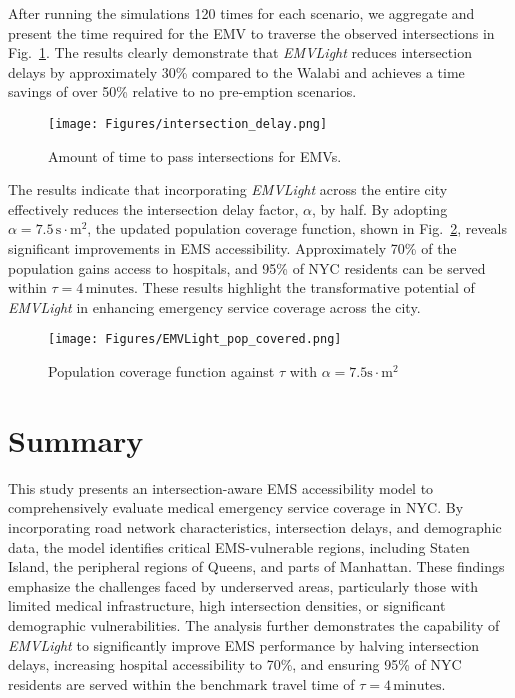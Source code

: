 After running the simulations 120 times for each scenario, we aggregate and present the time required for the EMV to traverse the observed intersections in Fig.~\ref{fig:intersection_delay}. The results clearly demonstrate that \textit{EMVLight} reduces intersection delays by approximately 30\% compared to the Walabi and achieves a time savings of over 50\% relative to no pre-emption scenarios. 
\begin{figure}[h]
    \centering
    \texttt{[image: Figures/intersection\_delay.png]} 
    \caption{Amount of time to pass intersections for EMVs.}
    \label{fig:intersection_delay}
\end{figure}

The results indicate that incorporating \textit{EMVLight} across the entire city effectively reduces the intersection delay factor, \(\alpha\), by half. By adopting \(\alpha = 7.5 \, \text{s} \cdot \text{m}^2\), the updated population coverage function, shown in Fig.~\ref{fig:emvlight_pop_covered}, reveals significant improvements in EMS accessibility. Approximately 70\% of the population gains access to hospitals, and 95\% of NYC residents can be served within \(\tau = 4 \, \text{minutes}\). These results highlight the transformative potential of \textit{EMVLight} in enhancing emergency service coverage across the city.

\begin{figure}[h]
    \centering
    \texttt{[image: Figures/EMVLight\_pop\_covered.png]} 
    \caption{Population coverage function against $\tau$ with $\alpha = 7.5 \text{s}\cdot\text{m}^2 $}
    \label{fig:emvlight_pop_covered}
\end{figure}

\section{Summary}\label{sec:conclusion_access}
This study presents an intersection-aware EMS accessibility model to comprehensively evaluate medical emergency service coverage in NYC. By incorporating road network characteristics, intersection delays, and demographic data, the model identifies critical EMS-vulnerable regions, including Staten Island, the peripheral regions of Queens, and parts of Manhattan. These findings emphasize the challenges faced by underserved areas, particularly those with limited medical infrastructure, high intersection densities, or significant demographic vulnerabilities. The analysis further demonstrates the capability of \textit{EMVLight} to significantly improve EMS performance by halving intersection delays, increasing hospital accessibility to 70\%, and ensuring 95\% of NYC residents are served within the benchmark travel time of \(\tau = 4 \, \text{minutes}\).


